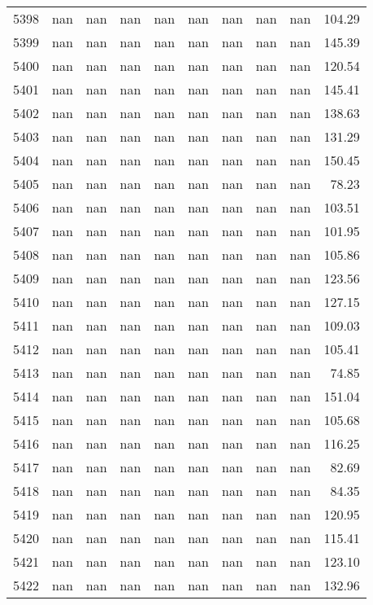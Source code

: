 \begin{tabular}{lrrrrrrrrr}
5398 & nan & nan & nan & nan & nan & nan & nan & nan & 104.29 \\
5399 & nan & nan & nan & nan & nan & nan & nan & nan & 145.39 \\
5400 & nan & nan & nan & nan & nan & nan & nan & nan & 120.54 \\
5401 & nan & nan & nan & nan & nan & nan & nan & nan & 145.41 \\
5402 & nan & nan & nan & nan & nan & nan & nan & nan & 138.63 \\
5403 & nan & nan & nan & nan & nan & nan & nan & nan & 131.29 \\
5404 & nan & nan & nan & nan & nan & nan & nan & nan & 150.45 \\
5405 & nan & nan & nan & nan & nan & nan & nan & nan & 78.23 \\
5406 & nan & nan & nan & nan & nan & nan & nan & nan & 103.51 \\
5407 & nan & nan & nan & nan & nan & nan & nan & nan & 101.95 \\
5408 & nan & nan & nan & nan & nan & nan & nan & nan & 105.86 \\
5409 & nan & nan & nan & nan & nan & nan & nan & nan & 123.56 \\
5410 & nan & nan & nan & nan & nan & nan & nan & nan & 127.15 \\
5411 & nan & nan & nan & nan & nan & nan & nan & nan & 109.03 \\
5412 & nan & nan & nan & nan & nan & nan & nan & nan & 105.41 \\
5413 & nan & nan & nan & nan & nan & nan & nan & nan & 74.85 \\
5414 & nan & nan & nan & nan & nan & nan & nan & nan & 151.04 \\
5415 & nan & nan & nan & nan & nan & nan & nan & nan & 105.68 \\
5416 & nan & nan & nan & nan & nan & nan & nan & nan & 116.25 \\
5417 & nan & nan & nan & nan & nan & nan & nan & nan & 82.69 \\
5418 & nan & nan & nan & nan & nan & nan & nan & nan & 84.35 \\
5419 & nan & nan & nan & nan & nan & nan & nan & nan & 120.95 \\
5420 & nan & nan & nan & nan & nan & nan & nan & nan & 115.41 \\
5421 & nan & nan & nan & nan & nan & nan & nan & nan & 123.10 \\
5422 & nan & nan & nan & nan & nan & nan & nan & nan & 132.96 \\

\end{tabular}
